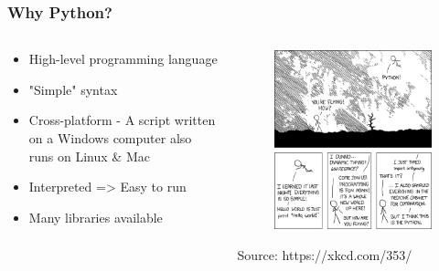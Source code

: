 \documentclass[10pt, a4paper]{beamer} %
\begin{document}
\begin{frame}[c]\frametitle{Why Python?}
  \begin{columns}
    \begin{column}{0.5\textwidth}
       \begin{itemize}
        \item High-level programming language
        \item "Simple" syntax
        \item Cross-platform - A script written on a Windows computer also runs on Linux \& Mac
        \item Interpreted => Easy to run
        \item Many libraries available
      \end{itemize}
    \end{column}
    \begin{column}{0.5\textwidth}  %
      \begin{figure}
        \includegraphics[width=0.9\linewidth]{pics/python.png}
      \end{figure}
      \tiny Source: https://xkcd.com/353/
    \end{column}
  \end{columns}

\end{frame}
\end{document}
